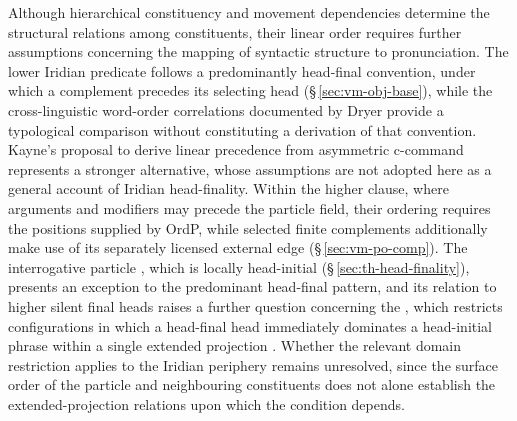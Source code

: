Although hierarchical constituency and movement dependencies determine the
structural relations among constituents, their linear order requires further
assumptions concerning the mapping of syntactic structure to pronunciation.
The lower Iridian predicate follows a predominantly head-final convention,
under which a complement precedes its selecting head
(§\,\ref{sec:vm-obj-base}), while the cross-linguistic word-order
correlations documented by Dryer \cite{dryer1992} provide a typological
comparison without constituting a derivation of that convention. Kayne's
proposal to derive linear precedence from asymmetric c-command
\cite{kayne1994} represents a stronger alternative, whose assumptions are
not adopted here as a general account of Iridian head-finality. Within the
higher clause, where arguments and modifiers may precede the particle field,
their ordering requires the positions supplied by OrdP, while selected
finite complements additionally make use of its separately licensed external
edge (§\,\ref{sec:vm-po-comp}). The interrogative particle , which
is locally head-initial (§\,\ref{sec:th-head-finality}), presents an
exception to the predominant head-final pattern, and its relation to higher
silent final heads raises a further question concerning the
, which restricts configurations in which a
head-final head immediately dominates a head-initial phrase within a single
extended projection \cite{biberauerholmbergroberts2014}. Whether the
relevant domain restriction applies to the Iridian periphery remains
unresolved, since the surface order of the particle and neighbouring
constituents does not alone establish the extended-projection relations upon
which the condition depends.

